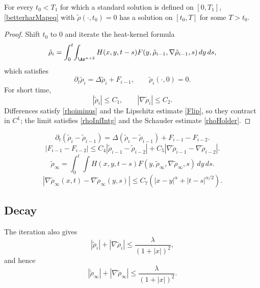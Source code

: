 \begin{proposition}
\label{prop:harmonic-map-flow-short-time-existence}
For every $t_0<T_1$ for which a standard solution is defined on $[0,T_1]$,
\eqref{betterharMapeq} with $\tilde\rho(\cdot,t_0)=0$ has a solution on
$[t_0,T]$ for some $T>t_0$.
\end{proposition}
\begin{proof}
\sketch Shift $t_0$ to $0$ and iterate the heat-kernel formula
\begin{equation}\label{rhoIntg}
 \tilde\rho_i=\int_0^t\!\int_{\Ar^{n+2}}H(x,y,t-s)F(y,\tilde\rho_{i-1},\nabla\tilde\rho_{i-1},s)\,dy\,ds,
\end{equation}
which satisfies
\begin{equation}\label{rhodiffeq}\partial_t\tilde\rho_i=\Delta\tilde\rho_i+F_{i-1},\qquad\tilde\rho_i(\cdot,0)=0.\end{equation}
For short time,
\begin{equation}\label{rho_i est}|\tilde\rho_i|\le C_1,\qquad|\nabla\tilde\rho_i|\le C_2.\end{equation}
Differences satisfy \eqref{rhoiminus} and the Lipschitz estimate \eqref{Flip},
so they contract in $C^1$; the limit satisfies \eqref{rhoInfIntg} and
the Schauder estimate \eqref{rhoHolder}.
\end{proof}
\begin{equation}\label{rhoiminus}
\partial_t(\tilde\rho_i-\tilde\rho_{i-1})=\Delta(\tilde\rho_i-\tilde\rho_{i-1})+F_{i-1}-F_{i-2}.
\end{equation}
\begin{equation}\label{Flip}|F_{i-1}-F_{i-2}|\le C_4|\tilde\rho_{i-1}-\tilde\rho_{i-2}|+C_5|\nabla\tilde\rho_{i-1}-\nabla\tilde\rho_{i-2}|.\end{equation}
\begin{equation}\label{rhoInfIntg}\tilde\rho_\infty=\int_0^t\!\int H(x,y,t-s)F(y,\tilde\rho_\infty,\nabla\tilde\rho_\infty,s)\,dy\,ds.\end{equation}
\begin{equation}\label{rhoHolder}|\nabla\tilde\rho_\infty(x,t)-\nabla\tilde\rho_\infty(y,s)|\le C_7(|x-y|^\alpha+|t-s|^{\alpha/2}).\end{equation}

\subsection{Decay}\label{harmsec}
The iteration also gives
\begin{equation}\label{rho_iDcay}|\tilde\rho_i|+|\nabla\tilde\rho_i|\le\frac\lambda{(1+|x|)^2},\end{equation}
and hence
\begin{equation}\label{rhodecay}|\tilde\rho_\infty|+|\nabla\tilde\rho_\infty|\le\frac\lambda{(1+|x|)^2}.\end{equation}

